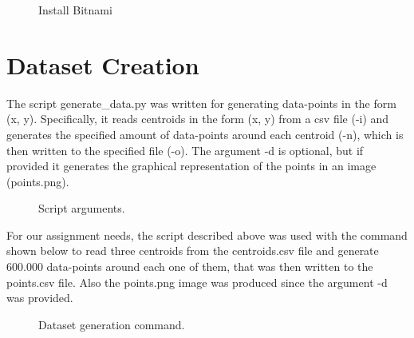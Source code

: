 \documentclass[11pt]{article}
\begin{document}
	 
	\begin{figure}[H]
		\caption{Install Bitnami}
	\end{figure}

	
	\newpage
	\section{Dataset Creation}
	The script generate\_data.py was written for generating data-points in the form (x, y). Specifically, it reads centroids in the form (x, y) from a csv file (-i) and generates the specified amount of data-points around each centroid (-n), which is then written to the specified file (-o). The argument -d is optional, but if provided it generates the graphical representation of the points in an image (points.png).
	
	\begin{figure}[H]
		\caption{Script arguments.}
	\end{figure}	

	For our assignment needs, the script described above was used with the command shown below to read three centroids from the centroids.csv file and generate 600.000 data-points around each one of them, that was then written to the points.csv file. Also the points.png image was produced since the argument -d was provided.    
	
	\begin{figure}[H]
		\caption{Dataset generation command.}
	\end{figure}        
	
\end{document}
